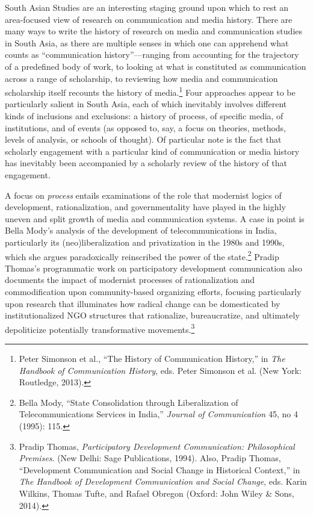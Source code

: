\documentclass{tufte-handout}
\begin{document}
South Asian Studies are an interesting staging ground upon which to rest
an area-focused view of research on communication and media history.
There are many ways to write the history of research on media and
communication studies in South Asia, as there are multiple senses in
which one can apprehend what counts as ``communication
history''---ranging from accounting for the trajectory of a predefined
body of work, to looking at what is constituted as communication across
a range of scholarship, to reviewing how media and communication
scholarship itself recounts the history of media.\footnote{Peter
  Simonson et al., ``The History of Communication History,'' in
  \emph{The Handbook of Communication History}, eds. Peter Simonson et
  al. (New York: Routledge, 2013).} Four approaches appear to be
particularly salient in South Asia, each of which inevitably involves
different kinds of inclusions and exclusions: a history of process, of
specific media, of institutions, and of events (as opposed to, say, a
focus on theories, methods, levels of analysis, or schools of thought).
Of particular note is the fact that scholarly engagement with a
particular kind of communication or media history has inevitably been
accompanied by a scholarly review of the history of that engagement.

A focus on \emph{process} entails examinations of the role that
modernist logics of development, rationalization, and governmentality
have played in the highly uneven and split growth of media and
communication systems. A case in point is Bella Mody's analysis of the
development of telecommunications in India, particularly its
(neo)liberalization and privatization in the 1980s and 1990s, which she
argues paradoxically reinscribed the power of the state.\footnote{Bella
  Mody, ``State Consolidation through Liberalization of
  Telecommunications Services in India,'' \emph{Journal of
  Communication} 45, no 4 (1995): 115.} Pradip Thomas's programmatic
work on participatory development communication also documents the
impact of modernist processes of rationalization and commodification
upon community-based organizing efforts, focusing particularly upon
research that illuminates how radical change can be domesticated by
institutionalized NGO structures that rationalize, bureaucratize, and
ultimately depoliticize potentially transformative movements.\footnote{Pradip
  Thomas, \emph{Participatory Development Communication: Philosophical
  Premises}. (New Delhi: Sage Publications, 1994). Also, Pradip Thomas,
  ``Development Communication and Social Change in Historical Context,''
  in \emph{The Handbook of Development Communication and Social Change},
  eds. Karin Wilkins, Thomas Tufte, and Rafael Obregon (Oxford: John
  Wiley \& Sons, 2014).}
\end{document}
